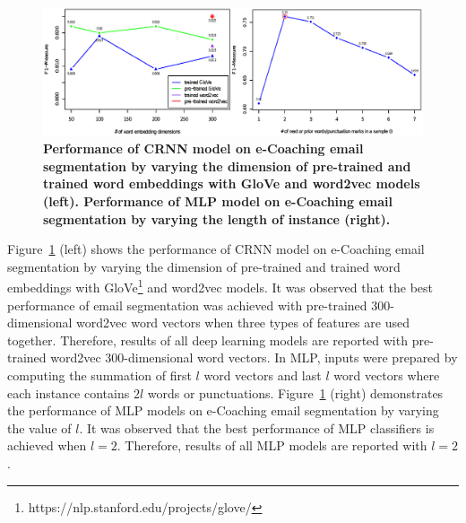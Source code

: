 \documentclass{amia}
\begin{document}
\begin{figure}[!htb]
    \centering
    \includegraphics[width=1.0\textwidth]{figures/mlp-and-vector.eps}
    \caption{\textbf{Performance of CRNN model on e-Coaching email segmentation by varying the dimension of pre-trained and trained word embeddings with GloVe and word2vec models (left). Performance of MLP model on e-Coaching email segmentation by varying the length of instance (right).}}
    \label{fig:embedding-dimension-mlp}
\end{figure}   
 
Figure~\ref{fig:embedding-dimension-mlp} (left) shows the performance of CRNN model on e-Coaching email segmentation by varying the dimension of pre-trained and trained word embeddings with GloVe\footnote{https://nlp.stanford.edu/projects/glove/} and word2vec models. It was observed that the best performance of email segmentation was achieved with pre-trained 300-dimensional word2vec word vectors when three types of features are used together. Therefore, results of all deep learning models are reported with pre-trained word2vec 300-dimensional word vectors. In MLP, inputs were prepared by computing the summation of first $l$ word vectors and last $l$ word vectors where each instance contains $2l$ words or punctuations. Figure~\ref{fig:embedding-dimension-mlp} (right) demonstrates the performance of MLP models on e-Coaching email segmentation by varying the value of $l$. It was observed that the best performance of MLP classifiers is achieved when $l = 2$. Therefore, results of all MLP models are reported with $l = 2$.    
\end{document}
